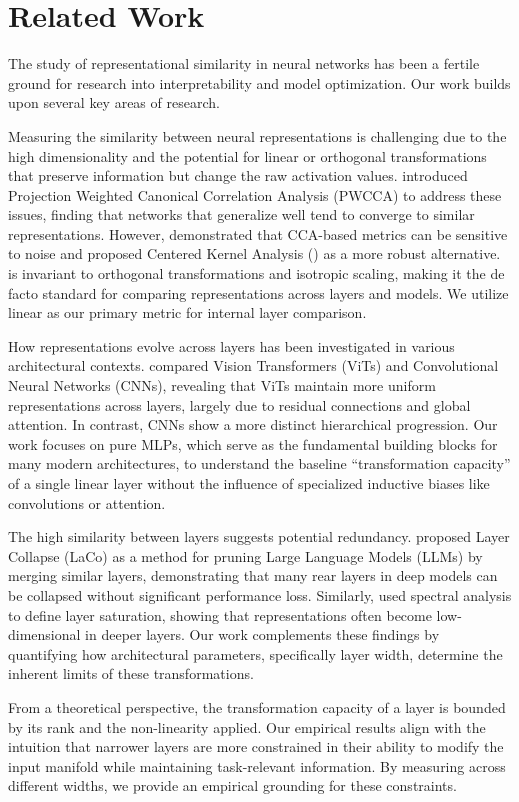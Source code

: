 \section{Related Work}
\label{sec:related}

The study of representational similarity in neural networks has been a fertile ground for research into interpretability and model optimization. Our work builds upon several key areas of research.

Measuring the similarity between neural representations is challenging due to the high dimensionality and the potential for linear or orthogonal transformations that preserve information but change the raw activation values. \citet{morcos2018insights} introduced Projection Weighted Canonical Correlation Analysis (PWCCA) to address these issues, finding that networks that generalize well tend to converge to similar representations. However, \citet{kornblith2019similarity} demonstrated that CCA-based metrics can be sensitive to noise and proposed Centered Kernel Analysis (\cka) as a more robust alternative. \cka is invariant to orthogonal transformations and isotropic scaling, making it the de facto standard for comparing representations across layers and models. We utilize linear \cka as our primary metric for internal layer comparison.

How representations evolve across layers has been investigated in various architectural contexts. \citet{raghu2021vision} compared Vision Transformers (ViTs) and Convolutional Neural Networks (CNNs), revealing that ViTs maintain more uniform representations across layers, largely due to residual connections and global attention. In contrast, CNNs show a more distinct hierarchical progression. Our work focuses on pure MLPs, which serve as the fundamental building blocks for many modern architectures, to understand the baseline ``transformation capacity'' of a single linear layer without the influence of specialized inductive biases like convolutions or attention.

The high similarity between layers suggests potential redundancy. \citet{yang2024laco} proposed Layer Collapse (LaCo) as a method for pruning Large Language Models (LLMs) by merging similar layers, demonstrating that many rear layers in deep models can be collapsed without significant performance loss. Similarly, \citet{shenk2019spectral} used spectral analysis to define layer saturation, showing that representations often become low-dimensional in deeper layers. Our work complements these findings by quantifying how architectural parameters, specifically layer width, determine the inherent limits of these transformations.

From a theoretical perspective, the transformation capacity of a layer is bounded by its rank and the non-linearity applied. Our empirical results align with the intuition that narrower layers are more constrained in their ability to modify the input manifold while maintaining task-relevant information. By measuring \repdiv across different widths, we provide an empirical grounding for these constraints.
